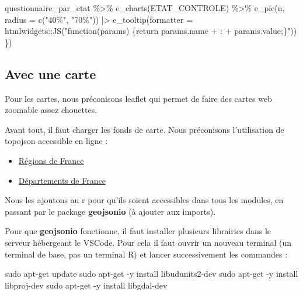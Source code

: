 \documentclass[
  letterpaper,
  DIV=11,
  numbers=noendperiod]{scrreprt}
\newenvironment{Shaded}{\begin{snugshade}}{\end{snugshade}}
\newcommand{\AttributeTok}[1]{\textcolor[rgb]{0.40,0.45,0.13}{#1}}
\newcommand{\FunctionTok}[1]{\textcolor[rgb]{0.28,0.35,0.67}{#1}}
\newcommand{\NormalTok}[1]{\textcolor[rgb]{0.00,0.23,0.31}{#1}}
\newcommand{\OperatorTok}[1]{\textcolor[rgb]{0.37,0.37,0.37}{#1}}
\newcommand{\SpecialCharTok}[1]{\textcolor[rgb]{0.37,0.37,0.37}{#1}}
\newcommand{\StringTok}[1]{\textcolor[rgb]{0.13,0.47,0.30}{#1}}
\providecommand{\tightlist}{%
  \setlength{\itemsep}{0pt}\setlength{\parskip}{0pt}}\usepackage{longtable,booktabs,array}
\begin{document}
\begin{Shaded}
\begin{Highlighting}[]
\NormalTok{       questionnaire\_par\_etat }\SpecialCharTok{\%\textgreater{}\%}
        \FunctionTok{e\_charts}\NormalTok{(ETAT\_CONTROLE) }\SpecialCharTok{\%\textgreater{}\%}
        \FunctionTok{e\_pie}\NormalTok{(n, }\AttributeTok{radius =} \FunctionTok{c}\NormalTok{(}\StringTok{"40\%"}\NormalTok{, }\StringTok{"70\%"}\NormalTok{)) }\SpecialCharTok{|\textgreater{}}
        \FunctionTok{e\_tooltip}\NormalTok{(}\AttributeTok{formatter =}\NormalTok{ htmlwidgets}\SpecialCharTok{::}\FunctionTok{JS}\NormalTok{(}\StringTok{"function(params) \{return params.name + \textquotesingle{}: \textquotesingle{} + params.value;\}"}\NormalTok{))}
\NormalTok{    \})}
\end{Highlighting}
\end{Shaded}

\hypertarget{avec-une-carte}{%
\subsection{Avec une carte}\label{avec-une-carte}}

Pour les cartes, nous préconisons leaflet qui permet de faire des cartes
web zoomable assez chouettes.

Avant tout, il faut charger les fonds de carte. Nous préconisons
l'utilisation de topojson accessible en ligne :

\begin{itemize}
\tightlist
\item
  \href{https://raw.githubusercontent.com/neocarto/resources/master/geometries/France/regions.topojson}{Régions
  de France}
\item
  \href{https://raw.githubusercontent.com/neocarto/resources/master/geometries/France/departements.topojson}{Départements
  de France}
\end{itemize}

Nous les ajoutons au r pour qu'ils soient accessibles dans tous les
modules, en passant par le package \textbf{geojsonio} (à ajouter aux
imports).

Pour que \textbf{geojsonio} fonctionne, il faut installer plusieurs
librairies dans le serveur hébergeant le VSCode. Pour cela il faut
ouvrir un nouveau terminal (un terminal de base, pas un terminal R) et
lancer successivement les commandes :

\begin{Shaded}
\begin{Highlighting}[]
\NormalTok{sudo apt}\OperatorTok{{-}}\NormalTok{get update}
\NormalTok{sudo apt}\OperatorTok{{-}}\NormalTok{get }\OperatorTok{{-}}\NormalTok{y install libudunits2}\OperatorTok{{-}}\NormalTok{dev}
\NormalTok{sudo apt}\OperatorTok{{-}}\NormalTok{get }\OperatorTok{{-}}\NormalTok{y install libproj}\OperatorTok{{-}}\NormalTok{dev}
\NormalTok{sudo apt}\OperatorTok{{-}}\NormalTok{get }\OperatorTok{{-}}\NormalTok{y install libgdal}\OperatorTok{{-}}\NormalTok{dev}
\end{Highlighting}
\end{Shaded}
\end{document}
